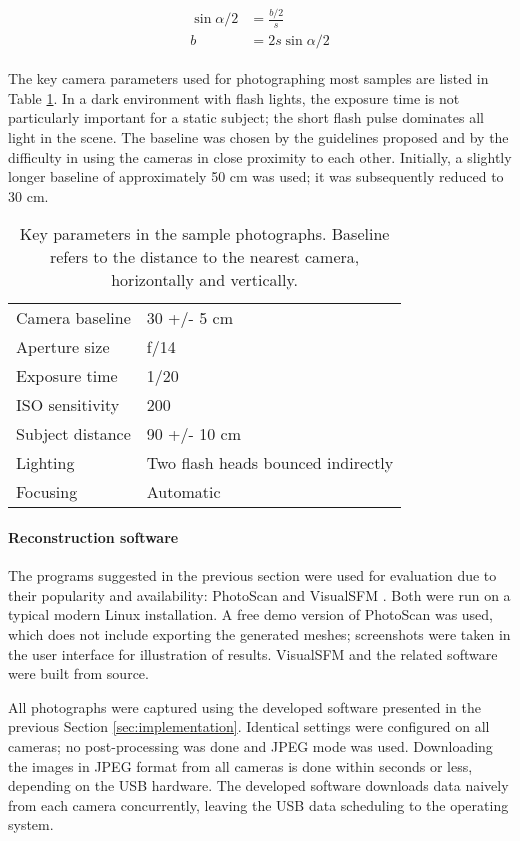 \begin{align} \begin{split} \label{eq:baselinedegrees}
	\sin \alpha/2 &= \frac{b/2}{s}\\
	b &= 2 s \sin \alpha/2
\end{split} \end{align}

The key camera parameters used for photographing most samples are listed in Table \ref{tab:sampleshotparams}.
In a dark environment with flash lights, the exposure time is not particularly important for a static subject; the short flash pulse dominates all light in the scene.
The baseline was chosen by the guidelines proposed and by the difficulty in using the cameras in close proximity to each other.
Initially, a slightly longer baseline of approximately 50 cm was used; it was subsequently reduced to 30 cm.

\begin{table}[h]
	\centering
	\begin{tabular}{l l}
		Camera baseline & 30 +/- 5 cm\\
		Aperture size & f/14\\
		Exposure time & 1/20\\
		ISO sensitivity & 200\\
		Subject distance & 90 +/- 10 cm\\
		Lighting & Two flash heads bounced indirectly\\
		Focusing & Automatic\\
	\end{tabular}
	\caption{
		Key parameters in the sample photographs.
		Baseline refers to the distance to the nearest camera, horizontally and vertically.
	}
	\label{tab:sampleshotparams}
\end{table}

\paragraph{Reconstruction software}
The programs suggested in the previous section were used for evaluation due to their popularity and availability: PhotoScan \cite{photoscan} and VisualSFM \cite{wu2013towards}.
Both were run on a typical modern Linux installation.
A free demo version of PhotoScan was used, which does not include exporting the generated meshes; screenshots were taken in the user interface for illustration of results.
VisualSFM and the related software were built from source.

All photographs were captured using the developed software presented in the previous Section \ref{sec:implementation}.
Identical settings were configured on all cameras; no post-processing was done and JPEG mode was used.
Downloading the images in JPEG format from all cameras is done within seconds or less, depending on the USB hardware.
The developed software downloads data naively from each camera concurrently, leaving the USB data scheduling to the operating system.
